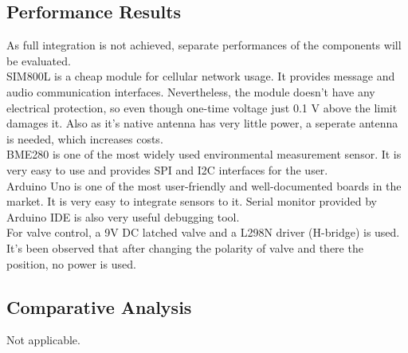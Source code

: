 \documentclass[conference]{IEEEtran}
\begin{document}
\subsection{Performance Results}
As full integration is not achieved, separate performances of the components will be evaluated.\\
SIM800L is a cheap module for cellular network usage. It provides message and audio communication interfaces. Nevertheless, the module doesn't have any electrical protection, so even though one-time voltage just 0.1 V above the limit damages it. Also as it's native antenna has very little power, a seperate antenna is needed, which increases costs.\\
BME280 is one of the most widely used environmental measurement sensor. It is very easy to use and provides SPI and I2C interfaces for the user.\\
Arduino Uno is one of the most user-friendly and well-documented boards in the market. It is very easy to integrate sensors to it. Serial monitor provided by Arduino IDE is also very useful debugging tool.\\
For valve control, a 9V DC latched valve and a L298N driver (H-bridge) is used. It's been observed that after changing the polarity of valve and there the position, no power is used.
\subsection{Comparative Analysis}
Not applicable.
\end{document}
